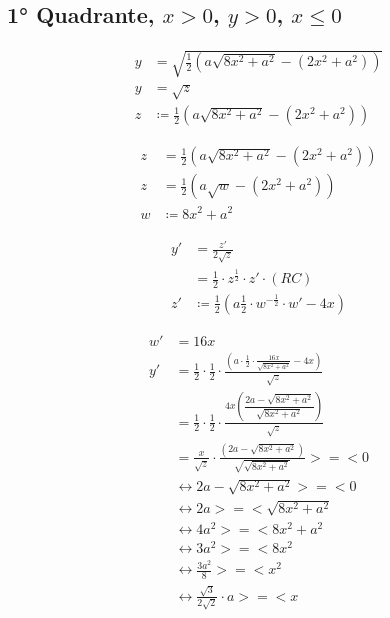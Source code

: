\documentclass[../resumo.tex]{subfiles}
\begin{document}
	\subsection{1° Quadrante, $x > 0$, $y > 0$, $x \leq 0$}

	\begin{align*}
		y &= \sqrt{\frac{1}{2}(a\sqrt{8x^2 + a^2} - (2x^2 + a^2))} \\
		y &= \sqrt{z} \\
		z &\coloneq \frac{1}{2} (a\sqrt{8x^2 + a^2} - (2x^2 + a^2))
	\end{align*}

	\begin{align*}
		z &= \frac{1}{2} (a\sqrt{8x^2 + a^2} - (2x^2 + a^2)) \\
		z &= \frac{1}{2} (a\sqrt{w} - (2x^2+a^2)) \\
		w &\coloneq 8x^2 + a^2
	\end{align*}

	\begin{align*}
		y' &= \frac{z'}{2\sqrt{z}} \\
			 &= \frac{1}{2} \cdot z^{\frac{1}{2}} \cdot z' \cdot (RC) \\
		z' &\coloneq \frac{1}{2} (a \frac{1}{2} \cdot w^{-\frac{1}{2}} \cdot w' - 4x)
	\end{align*}

	\begin{align*}
		w' &= 16x \\
		y' &= \frac{1}{2} \cdot \frac{1}{2} \cdot \frac{\left(a \cdot \frac{1}{2} \cdot \frac{16x}{\sqrt{8x^2 + a^2}} - 4x\right)}{\sqrt{z}} \\
			 &= \frac{1}{2} \cdot \frac{1}{2} \cdot \frac{4x \left(\dfrac{2a - \sqrt{8x^2 + a^2}}{\sqrt{8x^2 + a^2}}\right)}{\sqrt{z}} \\
			 &= \frac{x}{\sqrt{z}} \cdot \frac{\left( 2a - \sqrt{8x^2 + a^2} \right)}{\sqrt{\sqrt{8x^2 + a^2}}} >=< 0 \\
			 &\longleftrightarrow 2a - \sqrt{8x^2 + a^2} >=< 0 \\
			 &\longleftrightarrow 2a >=< \sqrt{8x^2 + a^2} \\
			 &\longleftrightarrow 4a^2 >=< 8x^2 + a^2 \\
			 &\longleftrightarrow 3a^2 >=< 8x^2 \\
			 &\longleftrightarrow \frac{3a^2}{8} >=< x^2 \\
			 &\longleftrightarrow \frac{\sqrt{3}}{2 \sqrt{2}} \cdot a >=< x
	\end{align*}
\end{document}

